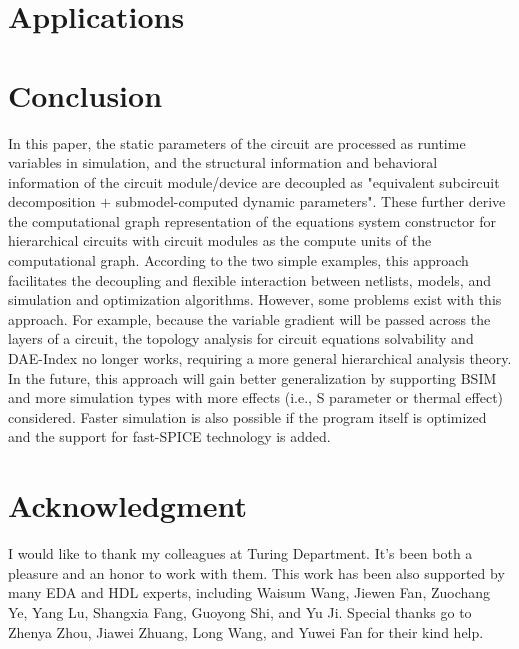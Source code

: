 \documentclass[a4paper,12pt]{article}
\begin{document}
\section{Applications}\label{sec:applications}


\section{Conclusion}
In this paper, the static parameters of the circuit are processed as runtime variables in simulation, and the structural information and behavioral information of the circuit module/device are decoupled as "equivalent subcircuit decomposition + submodel-computed dynamic parameters". These further derive the computational graph representation of the equations system constructor for hierarchical circuits with circuit modules as the compute units of the computational graph. According to the two simple examples, this approach facilitates the decoupling and flexible interaction between netlists, models, and simulation and optimization algorithms. However, some problems exist with this approach. For example, because the variable gradient will be passed across the layers of a circuit, the topology analysis for circuit equations solvability and DAE-Index no longer works, requiring a more general hierarchical analysis theory. In the future, this approach will gain better generalization by supporting BSIM and more simulation types with more effects (i.e., S parameter or thermal effect) considered. Faster simulation is also possible if the program itself is optimized and the support for fast-SPICE technology is added.

\section*{Acknowledgment}
I would like to thank my colleagues at Turing Department. It's been both a pleasure and an honor to work with them. This work has been also supported by many EDA and HDL experts, including Waisum Wang, Jiewen Fan, Zuochang Ye, Yang Lu, Shangxia Fang, Guoyong Shi, and Yu Ji. Special thanks go to Zhenya Zhou, Jiawei Zhuang, Long Wang, and Yuwei Fan for their kind help.



\end{document}
